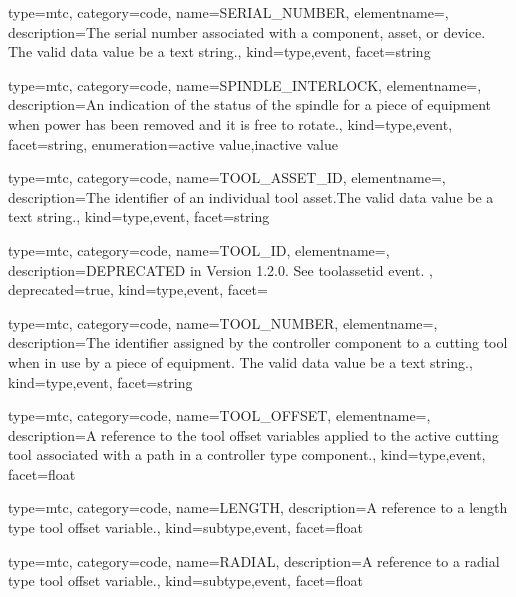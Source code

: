 {
  type=mtc,
  category=code,
  name={SERIAL\_NUMBER},
  elementname=,
  description={The serial number associated with a \gls{component}, \gls{asset}, or \gls{device}. The \gls{valid data value} \must be a text string.},
  kind={type,event},
  facet={\gls{string}}
}


{
  type=mtc,
  category=code,
  name={SPINDLE\_INTERLOCK},
  elementname=,
  description={An indication of the status of the spindle for a piece of equipment when power has been removed and it is free to rotate.},
  kind={type,event},
  facet={\gls{string}},
  enumeration={\gls{active value},\gls{inactive value}}
}


{
  type=mtc,
  category=code,
  name={TOOL\_ASSET\_ID},
  elementname=,
  description={The identifier of an individual tool asset.The \gls{valid data value} \must be a text string.},
  kind={type,event},
  facet={\gls{string}}
}


{
  type=mtc,
  category=code,
  name={TOOL\_ID},
  elementname=,
  description={DEPRECATED in Version 1.2.0.   See \gls{toolassetid event}. },
  deprecated={true},
  kind={type,event},
  facet={}
}


{
  type=mtc,
  category=code,
  name={TOOL\_NUMBER},
  elementname=,
  description={The identifier assigned by the \gls{controller} component to a cutting tool when in use by a piece of equipment. \newline The \gls{valid data value} \must be a text string.},
  kind={type,event},
  facet={\gls{string}}
}


{
  type=mtc,
  category=code,
  name={TOOL\_OFFSET},
  elementname=,
  description={A reference to the tool offset variables applied to the active cutting tool associated with a \gls{path} in a \gls{controller} type component.},
  kind={type,event},
  facet={\gls{float}}
}


{
  type=mtc,
  category=code,
  name={LENGTH},
  description={A reference to a length type tool offset variable.},
  kind={subtype,event},
  facet={\gls{float}}
}


{
  type=mtc,
  category=code,
  name={RADIAL},
  description={A reference to a radial type tool offset variable.},
  kind={subtype,event},
  facet={\gls{float}}
}


